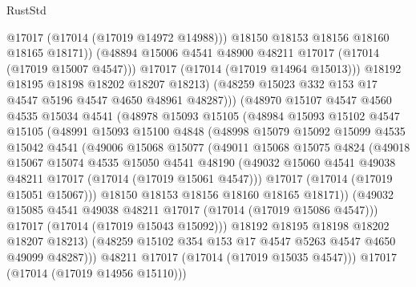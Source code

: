 \begin{lexlean}{RustStd}
\begin{coremodule}
{\begin{coremodule}
{{{{{{{{{{{{{{{{{{{{{{{{{{{{{{{{{{{{{{{{{{{{{{{{{{{{{{{                        @17017
                        (@17014 (@17019 @14972 @14988)))
                      @18150
                      @18153
                      @18156
                      @18160
                      @18165
                      @18171))
                  (@48894 @15006 @4541 @48900 @48211 @17017 (@17014 (@17019 @15007 @4547)))
                  @17017
                  (@17014 (@17019 @14964 @15013)))
                @18192
                @18195
                @18198
                @18202
                @18207
                @18213)
              (@48259 @15023 @332 @153 @17 @4547 @5196 @4547 @4650 @48961 @48287)))
          (@48970
            @15107
            @4547
            @4560
            @4535
            @15034
            @4541
            (@48978
              @15093
              @15105
              (@48984
                @15093
                @15102
                @4547
                @15105
                (@48991
                  @15093
                  @15100
                  @4848
                  (@48998
                    @15079
                    @15092
                    @15099
                    @4535
                    @15042
                    @4541
                    (@49006
                      @15068
                      @15077
                      (@49011
                        @15068
                        @15075
                        @4824
                        (@49018
                          @15067
                          @15074
                          @4535
                          @15050
                          @4541
                          @48190
                          (@49032 @15060 @4541 @49038 @48211 @17017 (@17014 (@17019 @15061 @4547)))
                          @17017
                          (@17014 (@17019 @15051 @15067)))
                        @18150
                        @18153
                        @18156
                        @18160
                        @18165
                        @18171))
                    (@49032 @15085 @4541 @49038 @48211 @17017 (@17014 (@17019 @15086 @4547)))
                    @17017
                    (@17014 (@17019 @15043 @15092)))
                  @18192
                  @18195
                  @18198
                  @18202
                  @18207
                  @18213)
                (@48259 @15102 @354 @153 @17 @4547 @5263 @4547 @4650 @49099 @48287)))
            @48211
            @17017
            (@17014 (@17019 @15035 @4547)))
          @17017
          (@17014 (@17019 @14956 @15110)))
}}}}}}}}}}}}}}}}}}}}}}}}}}}}}}}}}}}}}}}}}}}}}}}}}}}}}}}
\end{coremodule}}
\end{coremodule}
\end{lexlean}
